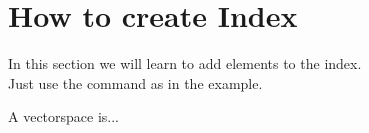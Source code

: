 \section{How to create Index}

In this section we will learn to add elements to the  index.\\
Just use the command as in the example.
\begin{defi}
    A vectorspace is...
\end{defi}
